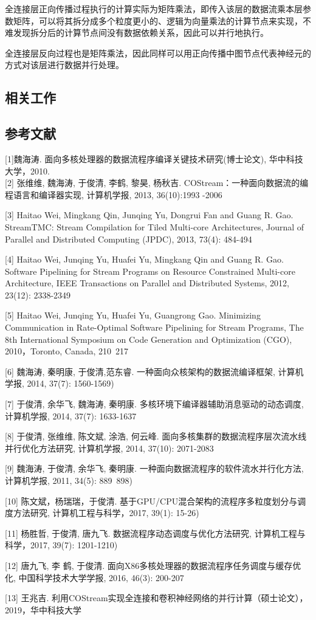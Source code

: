 全连接层正向传播过程执行的计算实际为矩阵乘法，即传入该层的数据流乘本层参数矩阵，可以将其拆分成多个粒度更小的、逻辑为向量乘法的计算节点来实现，不难发现拆分后的计算节点间没有数据依赖关系，因此可以并行地执行。

全连接层反向过程也是矩阵乘法，因此同样可以用正向传播中图节点代表神经元的方式对该层进行数据并行处理。

\subsection{相关工作}

\subsection{参考文献}
[1]魏海涛. 面向多核处理器的数据流程序编译关键技术研究(博士论文), 华中科技大学，2010.\\

[2] 张维维, 魏海涛, 于俊清, 李鹤, 黎昊, 杨秋吉. COStream：一种面向数据流的编程语言和编译器实现, 计算机学报, 2013, 36(10):1993 -2006

[3] Haitao Wei, Mingkang Qin, Junqing Yu, Dongrui Fan and Guang R. Gao. StreamTMC: Stream Compilation for Tiled Multi-core Architectures, Journal of Parallel and Distributed Computing (JPDC), 2013, 73(4): 484-494

[4] Haitao Wei, Junqing Yu, Huafei Yu, Mingkang Qin and Guang R. Gao. Software Pipelining for Stream Programs on Resource Constrained Multi-core Architecture, IEEE Transactions on Parallel and Distributed Systems, 2012, 23(12): 2338-2349

[5] Haitao Wei, Junqing Yu, Huafei Yu, Guangrong Gao. Minimizing Communication in Rate-Optimal Software Pipelining for Stream Programs, The 8th International Symposium on Code Generation and Optimization (CGO), 2010，Toronto, Canada, 210~217

[6] 魏海涛, 秦明康, 于俊清,范东睿. 一种面向众核架构的数据流编译框架, 计算机学报, 2014, 37(7): 1560-1569)

[7] 于俊清, 余华飞, 魏海涛, 秦明康. 多核环境下编译器辅助消息驱动的动态调度, 计算机学报, 2014, 37(7): 1633-1637

[8] 于俊清, 张维维, 陈文斌, 涂浩, 何云峰. 面向多核集群的数据流程序层次流水线并行优化方法研究, 计算机学报, 2014, 37(10): 2071-2083

[9] 魏海涛, 于俊清, 余华飞, 秦明康. 一种面向数据流程序的软件流水并行化方法, 计算机学报, 2011, 34(5): 889~898)

[10] 陈文斌，杨瑞瑞，于俊清. 基于GPU/CPU混合架构的流程序多粒度划分与调度方法研究, 计算机工程与科学，2017, 39(1): 15-26)

[11] 杨胜哲, 于俊清, 唐九飞. 数据流程序动态调度与优化方法研究, 计算机工程与科学，2017, 39(7): 1201-1210)

[12] 唐九飞, 李 鹤, 于俊清. 面向X86多核处理器的数据流程序任务调度与缓存优化, 中国科学技术大学学报, 2016, 46(3): 200-207

[13] 王兆吉. 利用COStream实现全连接和卷积神经网络的并行计算（硕士论文），2019，华中科技大学